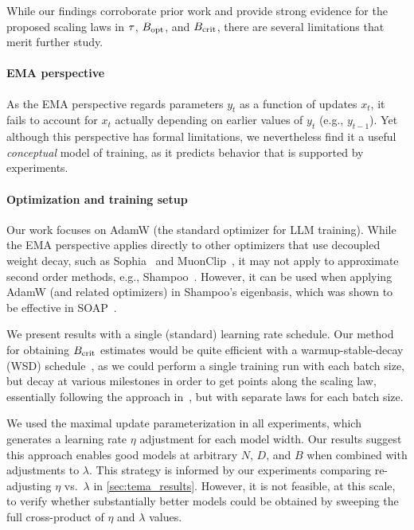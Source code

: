 While our findings corroborate prior work and provide strong evidence
for the proposed scaling laws in $\tau$, $B_{\text{opt}}$, and $B_{\text{crit}}$,
there are several limitations that merit further study.

\paragraph{EMA perspective}

As the EMA perspective regards parameters $y_t$ as a function of
updates $x_t$, it fails to account for $x_t$ actually depending on
earlier values of $y_t$ (e.g., $y_{t-1}$). Yet although this
perspective has formal limitations, we nevertheless find it a
useful \emph{conceptual} model of training, as it predicts behavior
that is supported by experiments.

\paragraph{Optimization and training setup}

Our work focuses on AdamW (the standard optimizer for LLM training).
While the EMA perspective applies directly to other optimizers that
use decoupled weight decay, such as Sophia~\citep{liu2023sophia} and
MuonClip~\citep{kimi2025k2}, it may not apply to approximate second
order methods, e.g., Shampoo~\citep{gupta2018shampoo}.  However, it
can be used when applying AdamW (and related optimizers) in Shampoo's
eigenbasis, which was shown to be effective in
SOAP~\citep{vyas2024soap}.

We present results with a single (standard) learning rate schedule.
Our method for obtaining $B_{\text{crit}}$ estimates would be quite efficient
with a warmup-stable-decay (WSD)
schedule~\citep{hu2024minicpm,wen2024understanding}, as we could
perform a single training run with each batch size, but decay at
various milestones in order to get points along the scaling law,
essentially following the approach in~\citet{hagele2024scaling}, but
with separate laws for each batch size.

We used the maximal update parameterization in all experiments, which
generates a learning rate $\eta$ adjustment for each model width.  Our
results suggest this approach enables good models at arbitrary $N$,
$D$, and $B$ when combined with adjustments to $\lambda$.  This
strategy is informed by our experiments comparing re-adjusting $\eta$
vs.\ $\lambda$ in \cref{sec:tema_results}. However, it is not
feasible, at this scale, to verify whether substantially better models
could be obtained by sweeping the full cross-product of $\eta$ and
$\lambda$ values.

